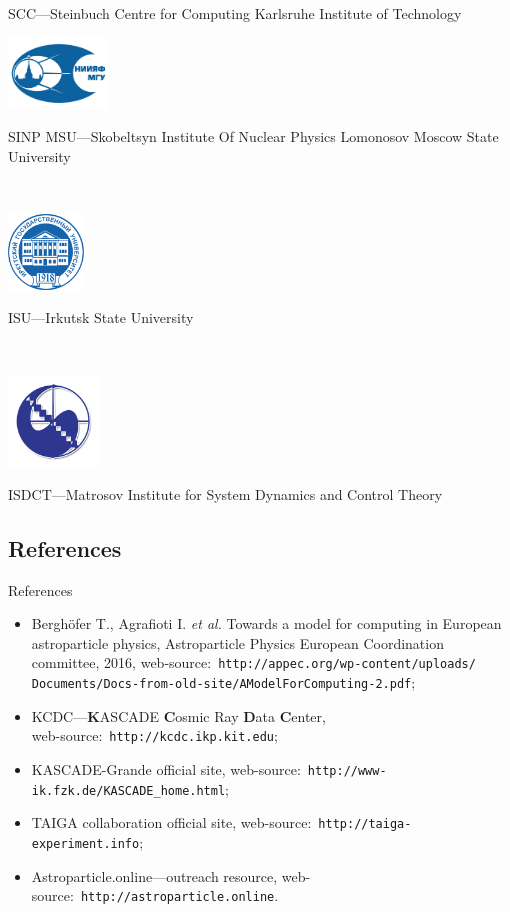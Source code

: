 \begin{frame}[allowframebreaks]
{  SCC---Steinbuch Centre for Computing Karlsruhe Institute of Technology
}
\\\vspace{1em}
\parbox{0.20\textwidth}{
  \centering\includegraphics[width=0.20\textwidth]{pics/SINP_MSU_LOGO.pdf}
}\hfill
\parbox{0.75\textwidth}{
  SINP MSU---Skobeltsyn Institute Of Nuclear Physics Lomonosov Moscow State University
}
\\\vspace{1em}
\parbox{0.20\textwidth}{
  \centering\includegraphics[width=0.15\textwidth]{pics/isu_logo.png}
}\hfill
\parbox{0.75\textwidth}{
  ISU---Irkutsk State University
}
\\\vspace{1em}
\parbox{0.20\textwidth}{
  \centering\includegraphics[width=0.18\textwidth]{pics/matr_logo.png}
}\hfill
\parbox{0.75\textwidth}{
  ISDCT---Matrosov Institute for System Dynamics and Control Theory
}
\end{frame}

\subsection{References}
    \begin{frame}{References}
        \begin{itemize}
            \item Berghöfer T., Agrafioti I. \textit{et al.} Towards a model for computing in European astroparticle physics,
            Astroparticle Physics European Coordination committee, 2016,
            web-source:~\texttt{http://appec.org/wp-content/uploads/\\Documents/Docs-from-old-site/AModelForComputing-2.pdf};
            \item KCDC---\textbf{K}ASCADE \textbf{C}osmic Ray \textbf{D}ata \textbf{C}enter,\\
            web-source:~\texttt{http://kcdc.ikp.kit.edu};
            \item KASCADE-Grande official site, web-source:~\texttt{http://www-ik.fzk.de/KASCADE\_home.html};
            \item TAIGA collaboration official site, web-source:~\texttt{http://taiga-experiment.info};
            \item Astroparticle.online---outreach resource, web-source:~\texttt{http://astroparticle.online}.
        \end{itemize}
    \end{frame}
